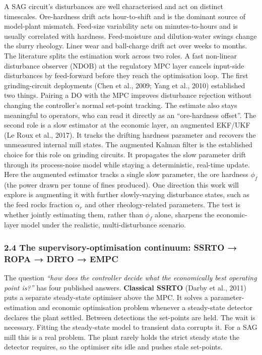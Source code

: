\documentclass[
  14pt,
]{extarticle}
\begin{document}
A SAG circuit's disturbances are well characterised and act on distinct
timescales. Ore-hardness drift acts hour-to-shift and is the dominant
source of model-plant mismatch. Feed-size variability acts on
minutes-to-hours and is usually correlated with hardness. Feed-moisture
and dilution-water swings change the slurry rheology. Liner wear and
ball-charge drift act over weeks to months. The literature splits the
estimation work across two roles. A fast non-linear disturbance observer
(NDOB) at the regulatory MPC layer cancels input-side disturbances by
feed-forward before they reach the optimisation loop. The first
grinding-circuit deployments (Chen et al., 2009; Yang et al., 2010)
established two things. Pairing a DO with the MPC improves disturbance
rejection without changing the controller's normal set-point tracking. The estimate also stays
meaningful to operators, who can read it directly as an ``ore-hardness
offset''. The second role is a slow estimator at the economic layer, an
augmented EKF/UKF (Le Roux et al., 2017). It tracks the drifting
hardness parameter and recovers the unmeasured internal mill states. The augmented
Kalman filter is the established choice for this role on grinding
circuits. It propagates the slow parameter drift through its
process-noise model while staying a deterministic, real-time update.
Here the augmented estimator tracks a single slow parameter, the ore
hardness $\phi_f$ (the power drawn per tonne of fines produced). One
direction this work will explore is augmenting it with further
slowly-varying disturbance states, such as the feed rocks fraction
$\alpha_r$ and other rheology-related parameters. The test is whether
jointly estimating them, rather than $\phi_f$ alone, sharpens the
economic-layer model under the realistic, multi-disturbance scenario.

\subsubsection{2.4 The supervisory-optimisation continuum: SSRTO → ROPA
→ DRTO →
EMPC}\label{the-supervisory-optimisation-continuum-ssrto-ropa-drto-empc}

The question \emph{``how does the controller decide what the
economically best operating point is?''} has four published answers.
\textbf{Classical SSRTO} (Darby et al., 2011) puts a separate
steady-state optimiser above the MPC. It solves a parameter-estimation
and economic optimisation problem whenever a steady-state detector
declares the plant settled. Between detections the set-points are held.
The wait is necessary. Fitting the steady-state model to transient data
corrupts it. For a SAG mill this is a real problem. The plant rarely
holds the strict steady state the detector requires, so the optimiser
sits idle and pushes stale set-points.
\end{document}
